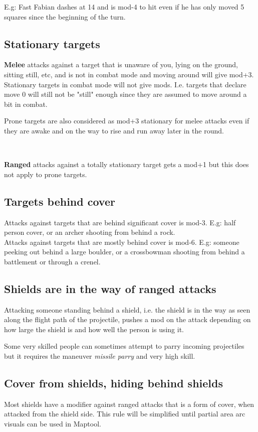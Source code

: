 E.g: Fast Fabian dashes at 14 and is mod-4 to hit even if he has only moved 5 squares since the beginning of the turn.


\subsection*{Stationary targets}
\textbf{Melee} attacks against a target that is unaware of you, lying on the ground, sitting still, etc, and is not in combat mode and moving around will give mod+3. Stationary targets in combat mode will not give mods. I.e. targets that declare move 0 will still not be "still" enough since they are assumed to move around a bit in combat.

Prone targets are also considered as mod+3 stationary for melee attacks even if they are awake and on the way to rise and run away later in the round. 

\

\noindent \textbf{Ranged} attacks against a totally stationary target gets a mod+1 but this does not apply to prone targets.


\subsection*{Targets behind cover}
Attacks against targets that are behind significant cover is mod-3. E.g: half person cover, or an archer shooting from behind a rock. \\
Attacks against targets that are mostly behind cover is mod-6. E.g: someone peeking out behind a large boulder, or a crossbowman shooting from behind a battlement or through a crenel.


\subsection*{Shields are in the way of ranged attacks}
Attacking someone standing behind a shield, i.e. the shield is in the way as seen along the flight path of the projectile, pushes a mod on the attack depending on how large the shield is and how well the person is using it.

Some very skilled people can sometimes attempt to parry incoming projectiles but it requires the maneuver \emph{missile parry} and very high skill.


\subsection*{Cover from shields, hiding behind shields}
Most shields have a modifier against ranged attacks that is a form of cover, when attacked from the shield side. This rule will be simplified until partial area arc visuals can be used in Maptool.

